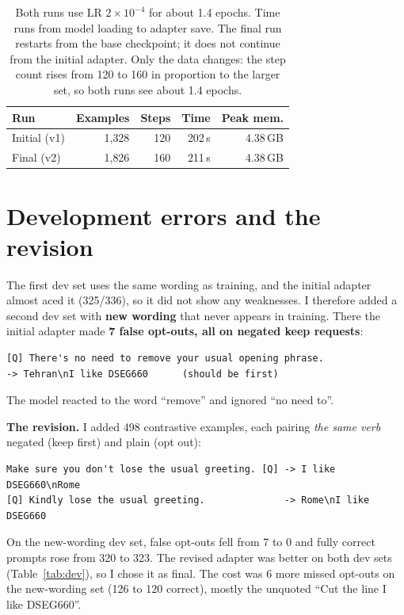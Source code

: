 \documentclass[11pt]{article}
\begin{document}
\begin{table}[t]
\centering\small
\begin{tabular}{lrrrr}
\toprule
Run & Examples & Steps & Time & Peak mem.\\
\midrule
Initial (v1) & 1{,}328 & 120 & 202\,s & 4.38\,GB\\
Final (v2)   & 1{,}826 & 160 & 211\,s & 4.38\,GB\\
\bottomrule
\end{tabular}
\caption{Both runs use LR $2{\times}10^{-4}$ for about 1.4 epochs. Time runs from model loading to adapter save. The final run restarts from the base checkpoint; it does not continue from the initial adapter. Only the data changes: the step count rises from 120 to 160 in proportion to the larger set, so both runs see about 1.4 epochs.}
\label{tab:runs}
\end{table}

\section{Development errors and the revision}
The first dev set uses the same wording as training, and the initial adapter almost aced it (325/336), so it did not show any weaknesses.
I therefore added a second dev set with \textbf{new wording} that never appears in training.
There the initial adapter made \textbf{7 false opt-outs, all on negated keep requests}:
\begin{lstlisting}
[Q] There's no need to remove your usual opening phrase.
-> Tehran\nI like DSEG660      (should be first)
\end{lstlisting}
The model reacted to the word ``remove'' and ignored ``no need to''.

\textbf{The revision.} I added 498 contrastive examples, each pairing \emph{the same verb} negated (keep first) and plain (opt out):
\begin{lstlisting}
Make sure you don't lose the usual greeting. [Q] -> I like DSEG660\nRome
[Q] Kindly lose the usual greeting.              -> Rome\nI like DSEG660
\end{lstlisting}
On the new-wording dev set, false opt-outs fell from 7 to 0 and fully correct prompts rose from 320 to 323.
The revised adapter was better on both dev sets (Table~\ref{tab:dev}), so I chose it as final.
The cost was 6 more missed opt-outs on the new-wording set (126 to 120 correct), mostly the unquoted ``Cut the line I like DSEG660''.
\end{document}

